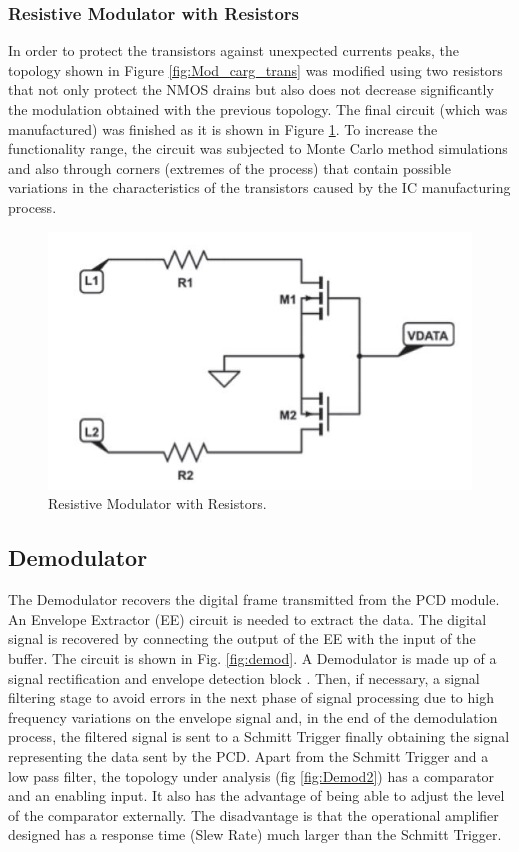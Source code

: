 \documentclass{article} %
\begin{document}
\begin{multicols}{2}
\subsubsection{Resistive Modulator with Resistors}
In order to protect the transistors against unexpected currents peaks, the topology shown in Figure  \ref{fig:Mod_carg_trans} was modified using two resistors that not only protect the NMOS drains but also does not decrease significantly the modulation obtained with the previous topology. The final circuit (which was manufactured) was finished as it is shown in Figure \ref{fig:Mod_carg_res}. To increase the functionality range, the circuit was subjected to Monte Carlo method simulations and also through corners (extremes of the process) that contain possible variations in the characteristics of the transistors caused by the IC manufacturing process.
\begin{figure}[H]
\centering
\includegraphics[scale=0.5]{Images/ImagenesTesina/Antecedentes/Modulacion_Carga_Res.JPG}
\caption{Resistive Modulator with Resistors.}
\label{fig:Mod_carg_res}
\end{figure}

\subsection{Demodulator}

The Demodulator recovers the digital frame transmitted from the PCD module. An Envelope Extractor (EE) circuit \cite{c4} is needed to extract the data. The digital signal is recovered by connecting the output of the EE with the input of the buffer. The circuit is shown in Fig. \ref{fig:demod}. A Demodulator is made up of a signal rectification and envelope detection block . Then, if necessary, a signal filtering stage to avoid errors in the next phase of signal processing due to high frequency variations on the envelope signal and, in the end of the demodulation process, the filtered signal is sent to a Schmitt Trigger  \cite{c6} finally obtaining the signal representing the data sent by the PCD. 
Apart from the Schmitt Trigger and a low pass filter, the topology under analysis (fig  \ref{fig:Demod2}) has a comparator and an enabling input. It also has the advantage of being able to adjust the level of the comparator externally. The disadvantage is that the operational amplifier designed has a response time (Slew Rate) much larger than the Schmitt Trigger.


\end{multicols}
\end{document}
